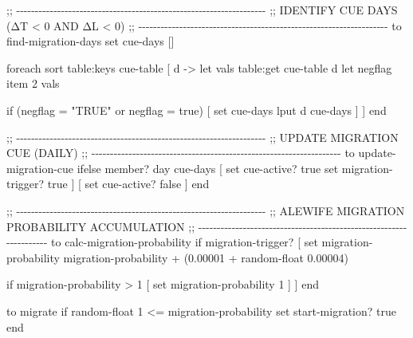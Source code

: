 \documentclass[
]{book}
\newenvironment{Shaded}{\begin{snugshade}}{\end{snugshade}}
\newcommand{\NormalTok}[1]{#1}
\begin{document}
\begin{Shaded}
\begin{Highlighting}[]
\NormalTok{;; {-}{-}{-}{-}{-}{-}{-}{-}{-}{-}{-}{-}{-}{-}{-}{-}{-}{-}{-}{-}{-}{-}{-}{-}{-}{-}{-}{-}{-}{-}{-}{-}{-}{-}{-}{-}{-}{-}{-}{-}{-}{-}{-}{-}{-}{-}{-}{-}{-}{-}{-}{-}{-}{-}{-}{-}{-}{-}{-}{-}{-}{-}{-}{-}{-}{-}{-}}
\NormalTok{;;  IDENTIFY CUE DAYS (ΔT \textless{} 0 AND ΔL \textless{} 0)}
\NormalTok{;; {-}{-}{-}{-}{-}{-}{-}{-}{-}{-}{-}{-}{-}{-}{-}{-}{-}{-}{-}{-}{-}{-}{-}{-}{-}{-}{-}{-}{-}{-}{-}{-}{-}{-}{-}{-}{-}{-}{-}{-}{-}{-}{-}{-}{-}{-}{-}{-}{-}{-}{-}{-}{-}{-}{-}{-}{-}{-}{-}{-}{-}{-}{-}{-}{-}{-}{-}}
\NormalTok{to find{-}migration{-}days}
\NormalTok{  set cue{-}days []}

\NormalTok{  foreach sort table:keys cue{-}table [}
\NormalTok{    d {-}\textgreater{}}
\NormalTok{      let vals table:get cue{-}table d}
\NormalTok{      let negflag item 2 vals}

\NormalTok{      if (negflag = "TRUE" or negflag = true) [}
\NormalTok{        set cue{-}days lput d cue{-}days}
\NormalTok{      ]}
\NormalTok{  ]}
\NormalTok{end}

\NormalTok{;; {-}{-}{-}{-}{-}{-}{-}{-}{-}{-}{-}{-}{-}{-}{-}{-}{-}{-}{-}{-}{-}{-}{-}{-}{-}{-}{-}{-}{-}{-}{-}{-}{-}{-}{-}{-}{-}{-}{-}{-}{-}{-}{-}{-}{-}{-}{-}{-}{-}{-}{-}{-}{-}{-}{-}{-}{-}{-}{-}{-}{-}{-}{-}{-}{-}{-}{-}}
\NormalTok{;;  UPDATE MIGRATION CUE (DAILY)}
\NormalTok{;; {-}{-}{-}{-}{-}{-}{-}{-}{-}{-}{-}{-}{-}{-}{-}{-}{-}{-}{-}{-}{-}{-}{-}{-}{-}{-}{-}{-}{-}{-}{-}{-}{-}{-}{-}{-}{-}{-}{-}{-}{-}{-}{-}{-}{-}{-}{-}{-}{-}{-}{-}{-}{-}{-}{-}{-}{-}{-}{-}{-}{-}{-}{-}{-}{-}{-}{-}}
\NormalTok{to update{-}migration{-}cue}
\NormalTok{  ifelse member? day cue{-}days [}
\NormalTok{    set cue{-}active? true}
\NormalTok{    set migration{-}trigger? true}
\NormalTok{  ] [}
\NormalTok{    set cue{-}active? false}
\NormalTok{  ]}
\NormalTok{end}

\NormalTok{;; {-}{-}{-}{-}{-}{-}{-}{-}{-}{-}{-}{-}{-}{-}{-}{-}{-}{-}{-}{-}{-}{-}{-}{-}{-}{-}{-}{-}{-}{-}{-}{-}{-}{-}{-}{-}{-}{-}{-}{-}{-}{-}{-}{-}{-}{-}{-}{-}{-}{-}{-}{-}{-}{-}{-}{-}{-}{-}{-}{-}{-}{-}{-}{-}{-}{-}{-}}
\NormalTok{;;  ALEWIFE MIGRATION PROBABILITY ACCUMULATION}
\NormalTok{;; {-}{-}{-}{-}{-}{-}{-}{-}{-}{-}{-}{-}{-}{-}{-}{-}{-}{-}{-}{-}{-}{-}{-}{-}{-}{-}{-}{-}{-}{-}{-}{-}{-}{-}{-}{-}{-}{-}{-}{-}{-}{-}{-}{-}{-}{-}{-}{-}{-}{-}{-}{-}{-}{-}{-}{-}{-}{-}{-}{-}{-}{-}{-}{-}{-}{-}{-}}
\NormalTok{to calc{-}migration{-}probability}
\NormalTok{  if migration{-}trigger? [}
\NormalTok{    set migration{-}probability}
\NormalTok{      migration{-}probability}
\NormalTok{      + (0.00001 + random{-}float 0.00004)}

\NormalTok{    if migration{-}probability \textgreater{} 1 [}
\NormalTok{      set migration{-}probability 1}
\NormalTok{    ]}
\NormalTok{  ]}
\NormalTok{end}

\NormalTok{to migrate}
\NormalTok{if random{-}float 1 \textless{}= migration{-}probability }
\NormalTok{set start{-}migration? true}
\NormalTok{end}
\end{Highlighting}
\end{Shaded}
\end{document}

